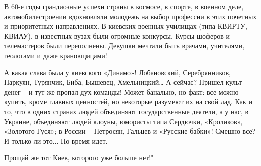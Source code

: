 В 60-е годы грандиозные успехи страны в космосе, в спорте, в военном деле,
автомобилестроении вдохновляли молодежь на выбор профессии в этих почетных и
приоритетных направлениях. В киевских военных училищах (типа КВИРТУ, КВИАУ), в
известных вузах были огромные конкурсы. Курсы шоферов и телемастеров были
переполнены. Девушки мечтали быть врачами, учителями, геологами и даже
крановщицами! 

А какая слава была у киевского «Динамо»! Лобановский, Серебрянников, Паркуян,
Турянчик, Биба, Бышевец, Хмельницкий… А сейчас? Пришел культ денег – и тут же
пропал дух команды! Может банально, но факт: все можно купить, кроме главных
ценностей, но некоторые разумеют их на свой лад. Как и то, что в одних странах
людей объединяют государственные деятели, а у нас, в Украине, объединяют людей
клоуны, юмористы типа Сердючки, «Кроликов», «Золотого Гуся»; в России –
Петросян, Гальцев и «Русские бабки»! Смешно все? И только ли это... Но время
идет. 

Прощай же тот Киев, которого уже больше нет!"
